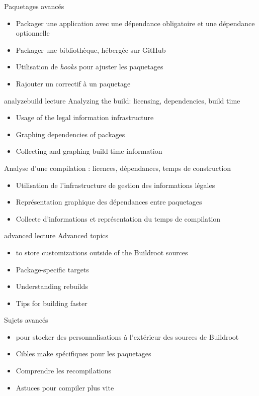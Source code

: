 {Paquetages avancés}
{
  \begin{itemize}
  \item Packager une application avec une dépendance obligatoire et
    une dépendance optionnelle
  \item Packager une bibliothèque, hébergée sur GitHub
  \item Utilisation de {\em hooks} pour ajuster les paquetages
  \item Rajouter un correctif à un paquetage
  \end{itemize}
}
{analyzebuild}
{lecture}
{Analyzing the build: licensing, dependencies, build time}
{
  \begin{itemize}
  \item Usage of the legal information infrastructure
  \item Graphing dependencies of packages
  \item Collecting and graphing build time information
  \end{itemize}
}
{Analyse d'une compilation : licences, dépendances, temps de
construction}
{
  \begin{itemize}
  \item Utilisation de l'infrastructure de gestion des informations
	légales
  \item Représentation graphique des dépendances entre paquetages
  \item Collecte d'informations et représentation du temps de
	compilation
  \end{itemize}
}
{advanced}
{lecture}
{Advanced topics}
{
  \begin{itemize}
  \item {} to store customizations outside of the
    Buildroot sources
  \item Package-specific targets
  \item Understanding rebuilds
  \item Tips for building faster
  \end{itemize}
}
{Sujets avancés}
{
  \begin{itemize}
  \item {} pour stocker des personnalisations à
	l'extérieur des sources de Buildroot
  \item Cibles make spécifiques pour les paquetages
  \item Comprendre les recompilations
  \item Astuces pour compiler plus vite
  \end{itemize}
}
